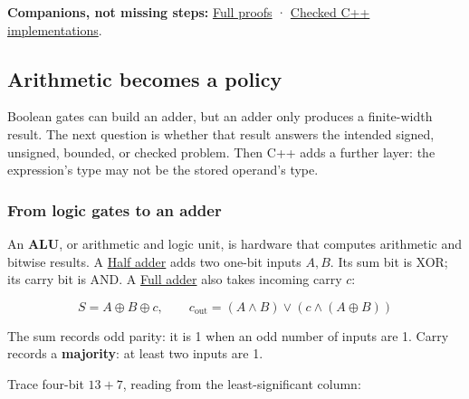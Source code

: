 \textbf{Companions, not missing steps:} \hyperref[01-foundations-i-ch011-m001---positional-value-masks-fields-and-de-morgan]{Full proofs} · \hyperref[appendix-4e2236f53445-m001---width-safe-fields-and-lsb-first-bit-packing]{Checked C++ implementations}.

\subsection{Arithmetic becomes a policy}\label{05-engine-i-ch001-arithmetic-becomes-a-policy}

Boolean gates can build an adder, but an adder only produces a finite-width result. The next question is whether that result answers the intended signed, unsigned, bounded, or checked problem. Then C++ adds a further layer: the expression's type may not be the stored operand's type.

\subsubsection{From logic gates to an adder}\label{05-engine-i-ch001-from-logic-gates-to-an-adder}

An \textbf{ALU}, or arithmetic and logic unit, is hardware that computes arithmetic and bitwise results. A \hyperref[appendix-1652d27a8e90]{Half adder} adds two one-bit inputs \(A,B\). Its sum bit is XOR; its carry bit is AND. A \hyperref[appendix-d1a5b1e520c2]{Full adder} also takes incoming carry \(c\):

\[
S=A\oplus B\oplus c,\qquad
c_{\mathrm{out}}=(A\land B)\lor(c\land(A\oplus B))
\]

The sum records odd parity: it is 1 when an odd number of inputs are 1. Carry records a \textbf{majority}: at least two inputs are 1.

Trace four-bit \(13+7\), reading from the least-significant column:

